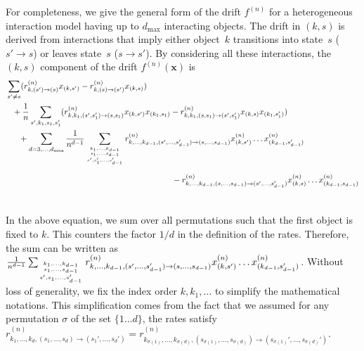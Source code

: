 \documentclass[acmsmall]{acmart}
\newcommand\bx{\mathbf{x}}
\newcommand\toN{^{(n)}}
\begin{document}
For completeness, we give the general form of the drift $f\toN$ for a heterogeneous interaction model having up to $d_{\max}$ interacting objects. The drift in $(k,s)$ is derived from interactions that imply either object~$k$ transitions into state~$s$ ($s' \rightarrow s$) or leaves state~$s$ ($s \rightarrow s'$). By considering all these interactions, the $(k,s)$ component of the drift $f\toN(\bx)$ is
\begin{align}
  & \sum_{s' \ne s} (r\toN_{k,(s') \rightarrow (s)} x_{(k,s')} - r\toN_{k,(s) \rightarrow (s')} x_{(k,s)})  \label{eq:drift_apx}\\
  & \phantom{+} + \frac1n \sum_{s',k_1, s_1,s_1'} (r\toN_{k,k_1,(s',s_1')\rightarrow (s,s_1)} x_{(k,s')}x_{(k_1,s_1)} - r\toN_{k,k_1,(s,s_1) \rightarrow (s',s'_1)} x_{(k,s)}x_{(k_1,s_1')}) \nonumber \\
  & \phantom{++} + \sum_{d=3,\hdots,d_{\max}} \frac{1}{n^{d-1}}\sum_{{k_1,...,k_{d-1} \atop s_1,...,s_{d-1}} \atop s', s_1', \hdots, s_{d-1}'} r_{k,\hdots,k_{d-1},(s',\hdots,s_{d-1}') \rightarrow (s,\hdots,s_{d-1})}\toN x_{(k,s')}^{(n)}\hdots x_{(k_{d-1},s_{d-1}')}^{(n)} \nonumber \\
  & \phantom{++ + \sum_{d=3,\hdots,d_{\max}}^{n} \frac{1}{n^{d-1}}\sum_{{k_1,...,k_{d-1} \atop s_1,...,s_{d-1}} \atop s', s_1', \hdots, s_{d-1}'}++++++} - r\toN_{k,\hdots,k_{d-1},(s,\hdots,s_{d-1}) \rightarrow (s',\hdots,s_{d-1}')} x_{(k,s)}^{(n)}\hdots x_{(k_{d-1},s_{d-1})}^{(n)} \nonumber
\end{align} 
In the above equation, we sum over all permutations such that the first object is fixed to $k$. This counters the factor $1/d$ in the definition of the rates. Therefore, the sum can be written as $\frac{1}{n^{d-1}}\sum_{{k_1,...,k_{d-1} \atop s_1,...,s_{d-1}} \atop s',s_1, \hdots, s_{d-1}'} r_{k,\hdots,k_{d-1},(s',\hdots,s_{d-1}') \rightarrow (s,\hdots,s_{d-1})}\toN x_{(k,s')}^{(n)}\hdots x_{(k_{d-1},s_{d-1}')}^{(n)}$. Without loss of generality, we fix the index order $k,k_1,\hdots$ to simplify the mathematical notations. This simplification comes from the fact that we assumed for any permutation $\sigma$ of the set $\{1\dots d\}$, the rates satisfy \newline $r_{k_1, \dots, k_{d}, (s_1, \dots, s_{d}) \rightarrow (s_1', \dots, s_{d}')}\toN = r_{k_{\sigma(1)}, \dots, k_{\sigma(d)}, (s_{\sigma(1)}, \dots, s_{\sigma(d)}) \rightarrow (s_{\sigma(1)}', \dots, s_{\sigma(d)}')}\toN$.

\end{document}
